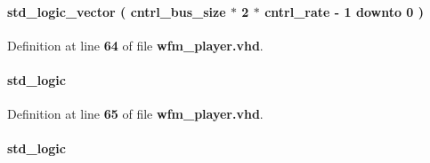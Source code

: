 \paragraph[{wfm\+\_\+infifo\+\_\+q}]{ {\bfseries \textcolor{comment}{std\+\_\+logic\+\_\+vector}\textcolor{vhdlchar}{ }\textcolor{vhdlchar}{(}\textcolor{vhdlchar}{ }\textcolor{vhdlchar}{ }\textcolor{vhdlchar}{ }\textcolor{vhdlchar}{ }{\bfseries {\bf cntrl\+\_\+bus\+\_\+size}} \textcolor{vhdlchar}{$\ast$}\textcolor{vhdlchar}{ } \textcolor{vhdldigit}{2} \textcolor{vhdlchar}{$\ast$}\textcolor{vhdlchar}{ }\textcolor{vhdlchar}{ }\textcolor{vhdlchar}{ }{\bfseries {\bf cntrl\+\_\+rate}} \textcolor{vhdlchar}{-\/}\textcolor{vhdlchar}{ } \textcolor{vhdldigit}{1} \textcolor{vhdlchar}{ }\textcolor{keywordflow}{downto}\textcolor{vhdlchar}{ }\textcolor{vhdlchar}{ } \textcolor{vhdldigit}{0} \textcolor{vhdlchar}{ }\textcolor{vhdlchar}{)}\textcolor{vhdlchar}{ }} \hspace{0.3cm}{\ttfamily [Signal]}}\label{classwfm__player_1_1arch_af55766a1f29d591dba8a083abd2cefb5}


Definition at line {\bf 64} of file {\bf wfm\+\_\+player.\+vhd}.

\paragraph[{wfm\+\_\+infifo\+\_\+rdempty}]{ {\bfseries \textcolor{comment}{std\+\_\+logic}\textcolor{vhdlchar}{ }} \hspace{0.3cm}{\ttfamily [Signal]}}\label{classwfm__player_1_1arch_aac937359aa773d288dba5320f1218f4c}


Definition at line {\bf 65} of file {\bf wfm\+\_\+player.\+vhd}.

\paragraph[{wfm\+\_\+infifo\+\_\+rdreq}]{ {\bfseries \textcolor{comment}{std\+\_\+logic}\textcolor{vhdlchar}{ }} \hspace{0.3cm}{\ttfamily [Signal]}}\label{classwfm__player_1_1arch_a742260e1682b0ca68cf85bf92d0120d6}


